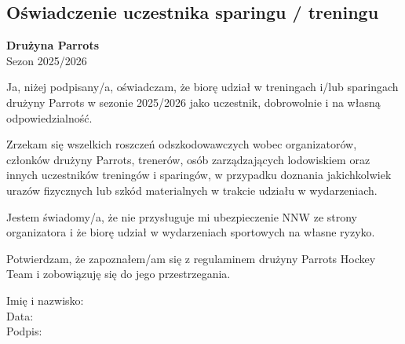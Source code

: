 \documentclass[12pt,a4paper]{article}
\begin{document}
\begin{center}
\section*{Oświadczenie uczestnika sparingu / treningu}
\textbf{Drużyna Parrots}\\
Sezon 2025/2026
\end{center}

\vspace{1em}

Ja, niżej podpisany/a, oświadczam, że biorę udział w treningach i/lub sparingach drużyny Parrots w sezonie 2025/2026 jako uczestnik, dobrowolnie i na własną odpowiedzialność.

\bigskip

Zrzekam się wszelkich roszczeń odszkodowawczych wobec organizatorów, członków drużyny Parrots, trenerów, osób zarządzających lodowiskiem oraz innych uczestników treningów i sparingów, w przypadku doznania jakichkolwiek urazów fizycznych lub szkód materialnych w trakcie udziału w wydarzeniach.

\bigskip

Jestem świadomy/a, że nie przysługuje mi ubezpieczenie NNW ze strony organizatora i że biorę udział w wydarzeniach sportowych na własne ryzyko.

\bigskip

Potwierdzam, że zapoznałem/am się z regulaminem drużyny Parrots Hockey Team i zobowiązuję się do jego przestrzegania.

\vspace{2em}

\noindent Imię i nazwisko: \dotfill \\[2em]
Data: \dotfill \\[2em]
Podpis: \dotfill
\end{document}
